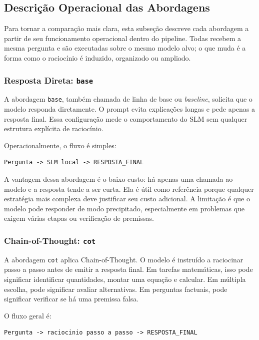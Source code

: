 \documentclass[12pt]{article}
\begin{document}
\subsection{Descrição Operacional das Abordagens}

Para tornar a comparação mais clara, esta subseção descreve cada abordagem a partir de seu funcionamento operacional dentro do pipeline. Todas recebem a mesma pergunta e são executadas sobre o mesmo modelo alvo; o que muda é a forma como o raciocínio é induzido, organizado ou ampliado.

\subsubsection{Resposta Direta: \texttt{base}}

A abordagem \texttt{base}, também chamada de linha de base ou \textit{baseline}, solicita que o modelo responda diretamente. O prompt evita explicações longas e pede apenas a resposta final. Essa configuração mede o comportamento do SLM sem qualquer estrutura explícita de raciocínio.

Operacionalmente, o fluxo é simples:

\begin{verbatim}
Pergunta -> SLM local -> RESPOSTA_FINAL
\end{verbatim}

A vantagem dessa abordagem é o baixo custo: há apenas uma chamada ao modelo e a resposta tende a ser curta. Ela é útil como referência porque qualquer estratégia mais complexa deve justificar seu custo adicional. A limitação é que o modelo pode responder de modo precipitado, especialmente em problemas que exigem várias etapas ou verificação de premissas.

\subsubsection{Chain-of-Thought: \texttt{cot}}

A abordagem \texttt{cot} aplica Chain-of-Thought. O modelo é instruído a raciocinar passo a passo antes de emitir a resposta final. Em tarefas matemáticas, isso pode significar identificar quantidades, montar uma equação e calcular. Em múltipla escolha, pode significar avaliar alternativas. Em perguntas factuais, pode significar verificar se há uma premissa falsa.

O fluxo geral é:

\begin{verbatim}
Pergunta -> raciocinio passo a passo -> RESPOSTA_FINAL
\end{verbatim}
\end{document}
